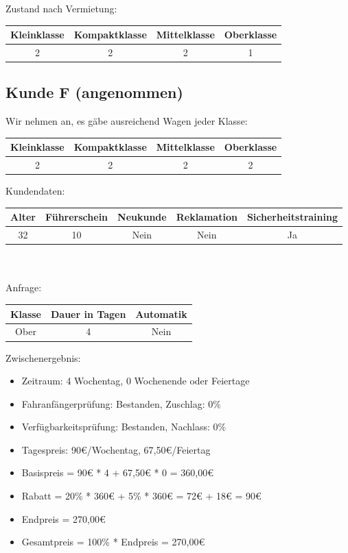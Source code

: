 Zustand nach Vermietung:\\
\begin{tabular}{|c|c|c|c|}
	\hline \textbf{Kleinklasse} & \textbf{Kompaktklasse} & \textbf{Mittelklasse} & \textbf{Oberklasse}  \\ 
	\hline 2 & 2 & 2 & 1 \\ 
	\hline 
\end{tabular}

\subsection{Kunde F (angenommen)}

Wir nehmen an, es gäbe ausreichend Wagen jeder Klasse:

\begin{tabular}{|c|c|c|c|}
	\hline \textbf{Kleinklasse} & \textbf{Kompaktklasse} & \textbf{Mittelklasse} & \textbf{Oberklasse}  \\ 
	\hline 2 & 2 & 2 & 2 \\ 
	\hline 
\end{tabular}

Kundendaten:\\
\begin{tabular}{|c|c|c|c|c|}
	\hline \textbf{Alter} & \textbf{Führerschein} & \textbf{Neukunde} & \textbf{Reklamation} & \textbf{Sicherheitstraining} \\ 
	\hline 32 & 10 & Nein & Nein & Ja \\ 
	\hline 
\end{tabular} 
\\\\
Anfrage:\\
\begin{tabular}{|c|c|c|}
	\hline \textbf{Klasse} & \textbf{Dauer in Tagen} & \textbf{Automatik} \\ 
	\hline Ober & 4 & Nein \\ 
	\hline 
\end{tabular}

Zwischenergebnis:
\begin{itemize}
	\item Zeitraum: 4 Wochentag, 0 Wochenende oder Feiertage
	\item Fahranfängerprüfung: Bestanden, Zuschlag: 0\%
	\item Verfügbarkeitsprüfung: Bestanden, Nachlass: 0\%
	\item Tagespreis: 90€/Wochentag, 67,50€/Feiertag
	\item Basispreis = 90€ * 4 + 67,50€ * 0 = 360,00€
	\item Rabatt = 20\% * 360€ + 5\% * 360€ = 72€ + 18€ = 90€
	\item Endpreis = 270,00€
	\item Gesamtpreis = 100\% * Endpreis = 270,00€
	
\end{itemize}

